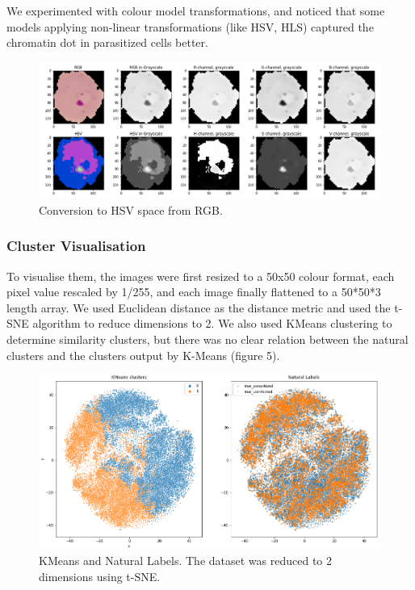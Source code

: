 \documentclass[10pt,twocolumn,letterpaper]{article}
\begin{document}
We experimented with colour model transformations, and noticed that some models applying non-linear transformations (like HSV, HLS) captured the chromatin dot in parasitized cells better.

\begin{figure}[t]
   \begin{center}
      \includegraphics[width=1\linewidth]{../Plots/hsv_conversion.png}
   \end{center}
      \caption{Conversion to HSV space from RGB.}
   \label{fig:HSV_space}
\end{figure}

\subsubsection{Cluster Visualisation}
To visualise them, the images were first resized to a 50x50 colour format, each pixel value rescaled by 1/255, and each image finally flattened to a 50*50*3 length array. We used Euclidean distance as the distance metric and used the t-SNE algorithm to reduce dimensions to 2. We also used KMeans clustering to determine similarity clusters, but there was no clear relation between the natural clusters and the clusters output by K-Means (figure 5).

\begin{figure}[t]
   \begin{center}
      \includegraphics[width=1\linewidth]{../Plots/kmeans_natural labels.png}
   \end{center}
      \caption{KMeans and Natural Labels. The dataset was reduced to 2 dimensions using t-SNE.}
   \label{fig:tsne_vis}
\end{figure}
\end{document}
